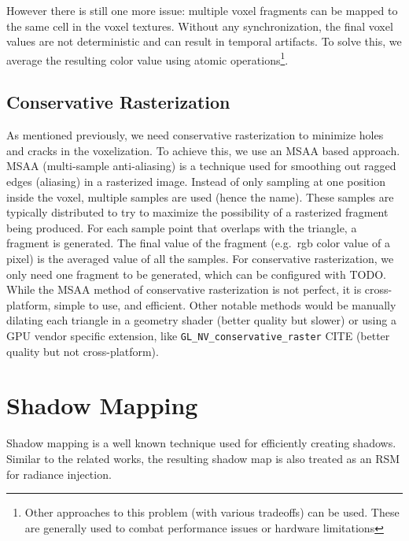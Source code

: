 However there is still one more issue: multiple voxel fragments can be mapped to the same cell in the voxel textures. Without any synchronization, the final voxel values are not deterministic and can result in temporal artifacts. To solve this, we average the resulting color value using atomic operations\footnote{Other approaches to this problem (with various tradeoffs) can be used. These are generally used to combat performance issues or hardware limitations}.

\subsection{Conservative Rasterization}
As mentioned previously, we need conservative rasterization to minimize holes and cracks in the voxelization. To achieve this, we use an MSAA based approach. MSAA (multi-sample anti-aliasing) is a technique used for smoothing out ragged edges (aliasing) in a rasterized image. Instead of only sampling at one position inside the voxel, multiple samples are used (hence the name). These samples are typically distributed to try to maximize the possibility of a rasterized fragment being produced. For each sample point that overlaps with the triangle, a fragment is generated. The final value of the fragment (e.g.\ rgb color value of a pixel) is the averaged value of all the samples. For conservative rasterization, we only need one fragment to be generated, which can be configured with TODO. While the MSAA method of conservative rasterization is not perfect, it is cross-platform, simple to use, and efficient. Other notable methods would be manually dilating each triangle in a geometry shader (better quality but slower) or using a GPU vendor specific extension, like \verb#GL_NV_conservative_raster# CITE (better quality but not cross-platform).


\section{Shadow Mapping}
Shadow mapping is a well known technique used for efficiently creating shadows. Similar to the related works, the resulting shadow map is also treated as an RSM for radiance injection.

